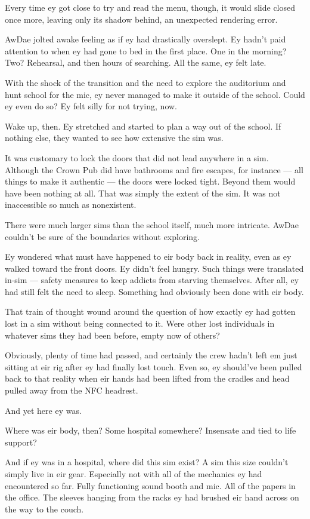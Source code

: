 Every time ey got close to try and read the menu, though, it would slide closed once more, leaving only its shadow behind, an unexpected rendering error.

AwDae jolted awake feeling as if ey had drastically overslept. Ey hadn't paid attention to when ey had gone to bed in the first place. One in the morning? Two? Rehearsal, and then hours of searching. All the same, ey felt late.

With the shock of the transition and the need to explore the auditorium and hunt school for the mic, ey never managed to make it outside of the school. Could ey even do so? Ey felt silly for not trying, now.

Wake up, then. Ey stretched and started to plan a way out of the school. If nothing else, they wanted to see how extensive the sim was.

It was customary to lock the doors that did not lead anywhere in a sim. Although the Crown Pub did have bathrooms and fire escapes, for instance — all things to make it authentic — the doors were locked tight. Beyond them would have been nothing at all. That was simply the extent of the sim. It was not inaccessible so much as nonexistent.

There were much larger sims than the school itself, much more intricate. AwDae couldn't be sure of the boundaries without exploring.

Ey wondered what must have happened to eir body back in reality, even as ey walked toward the front doors. Ey didn't feel hungry. Such things were translated in-sim — safety measures to keep addicts from starving themselves. After all, ey had still felt the need to sleep. Something had obviously been done with eir body.

That train of thought wound around the question of how exactly ey had gotten lost in a sim without being connected to it. Were other lost individuals in whatever sims they had been before, empty now of others?

Obviously, plenty of time had passed, and certainly the crew hadn't left em just sitting at eir rig after ey had finally lost touch. Even so, ey should've been pulled back to that reality when eir hands had been lifted from the cradles and head pulled away from the NFC headrest.

And yet here ey was.

Where was eir body, then? Some hospital somewhere? Insensate and tied to life support?

And if ey was in a hospital, where did this sim exist? A sim this size couldn't simply live in eir gear. Especially not with all of the mechanics ey had encountered so far. Fully functioning sound booth and mic. All of the papers in the office. The sleeves hanging from the racks ey had brushed eir hand across on the way to the couch.


